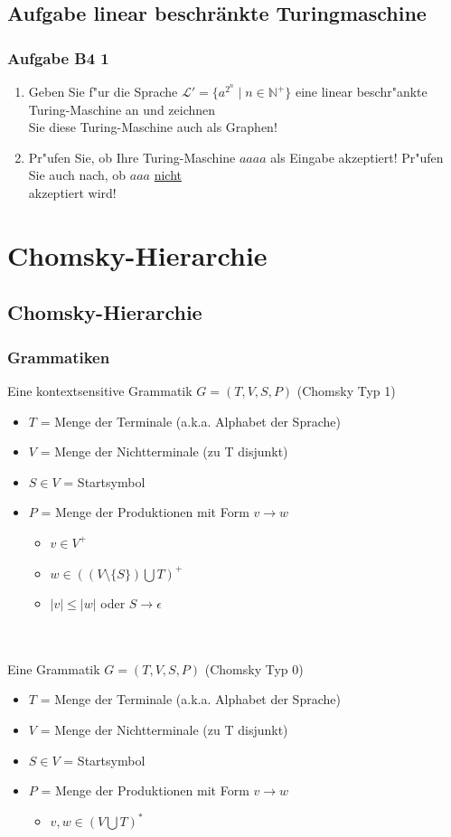 \subsection{Aufgabe linear beschränkte Turingmaschine}
\begin{frame}
\frametitle{Aufgabe B4 1}
\begin{enumerate}
\item Geben Sie f"ur die Sprache $\mathcal{L}' = \{a^{2^n} \; | \; n \in
\mathbb{N}^{+}\}$ eine linear beschr"ankte Turing-Maschine an und zeichnen\\
Sie diese Turing-Maschine auch als Graphen!
\item Pr"ufen Sie, ob Ihre Turing-Maschine $aaaa$ als Eingabe akzeptiert!
Pr"ufen Sie auch nach, ob $aaa$ \underline{nicht}\\
akzeptiert wird!
\end{enumerate}
\end{frame}

\section{Chomsky-Hierarchie}
\subsection{Chomsky-Hierarchie}
\begin{frame}
	\frametitle{Grammatiken}
Eine kontextsensitive Grammatik $G = ( T, V, S, P)$ (Chomsky Typ 1)
\begin{itemize}
	\item $T$ = Menge der Terminale (a.k.a. Alphabet der Sprache)
	\item $V$ = Menge der Nichtterminale (zu T disjunkt)
	\item $S \in V$ = Startsymbol
	\item $P$ = Menge der Produktionen mit Form $v \rightarrow w$
	\begin{itemize}
		\item $v \in V^{+}$
		\item $w \in ((V \setminus \{S\}) \bigcup T)^{+}$
		\item $|v| \leq |w|$ oder $S \rightarrow \epsilon$
	\end{itemize}
\end{itemize}~\\~\\




Eine Grammatik $G = ( T, V, S, P)$ (Chomsky Typ 0)
\begin{itemize}
	\item $T$ = Menge der Terminale (a.k.a. Alphabet der Sprache)
	\item $V$ = Menge der Nichtterminale (zu T disjunkt)
	\item $S \in V$ = Startsymbol
	\item $P$ = Menge der Produktionen mit Form $v \rightarrow w$
	\begin{itemize}
		\item $v,w \in (V \bigcup T)^{*}$
	\end{itemize}
\end{itemize}
\end{frame}

